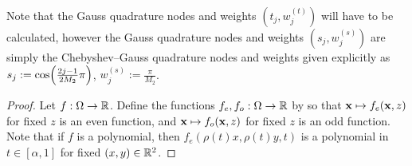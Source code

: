 \begin{remark} 
	Note that the Gauss quadrature nodes and weights $(t_j, w_j^{(t)})$ will have to be calculated, however the Gauss quadrature nodes and weights $(s_j, w_j^{(s)})$ are simply the Chebyshev--Gauss quadrature nodes and weights given explicitly \cite[3.5.23]{DLMF} as $s_j := \cos \fpr(\frac{2j - 1}{2M_2} \pi)$, $w_j^{(s)} := \frac{\pi}{M_2}$.
\end{remark}

\begin{proof}
Let $f : \Omega \to \mathbb{R}$. Define the functions $f_e, f_o : \Omega \to \mathbb{R}$ by 
so that $\mathbf{x} \mapsto f_e(\mathbf{x}, z)$ for fixed $z$ is an even function, and $\mathbf{x} \mapsto f_o(\mathbf{x}, z)$ for fixed $z$ is an odd function. Note that if $f$ is a polynomial, then $f_e(\rho(t)x, \rho(t)y, t)$ is a polynomial in $t \in [\alpha,1]$ for fixed $(x,y) \in \mathbb{R}^2$. 


\end{proof}
